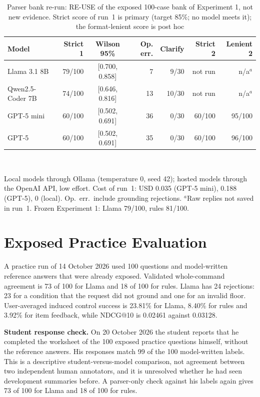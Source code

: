 \documentclass[conference]{IEEEtran}
\begin{document}
\begin{table}[t]\centering\scriptsize
\setlength{\tabcolsep}{2.6pt}
\caption{Parser bank re-run: RE-USE of the exposed 100-case bank of Experiment 1, not new evidence. Strict score of run~1 is primary (target 85\%; no model meets it); the format-lenient score is post hoc}\label{tab:parser}
\begin{tabular}{lrcrrrr}\toprule
Model & Strict 1 & Wilson 95\% & Op. err. & Clarify & Strict 2 & Lenient 2\\\midrule
Llama 3.1 8B & 79/100 & [0.700, 0.858] & 7 & 9/30 & not run & n/a$^{a}$\\
Qwen2.5-Coder 7B & 74/100 & [0.646, 0.816] & 13 & 10/30 & not run & n/a$^{a}$\\
GPT-5 mini & 60/100 & [0.502, 0.691] & 36 & 0/30 & 60/100 & 95/100\\
GPT-5 & 60/100 & [0.502, 0.691] & 35 & 0/30 & 60/100 & 96/100\\\bottomrule
\end{tabular}\\[2pt]
\parbox{\columnwidth}{\scriptsize Local models through Ollama (temperature 0, seed 42); hosted models through the OpenAI API, low effort. Cost of run~1: USD 0.035 (GPT-5 mini), 0.188 (GPT-5), 0 (local). Op.\ err.\ include grounding rejections. $^{a}$Raw replies not saved in run~1. Frozen Experiment 1: Llama 79/100, rules 81/100.}
\end{table}

\section{Exposed Practice Evaluation}
A practice run of 14 October 2026 used 100 questions and model-written reference answers that were already exposed. Validated whole-command agreement is 73 of 100 for Llama and 18 of 100 for rules. Llama has 24 rejections: 23 for a condition that the request did not ground and one for an invalid floor. User-averaged induced control success is 23.81\% for Llama, 8.40\% for rules and 3.92\% for item feedback, while NDCG@10 is 0.02461 against 0.03128. 

\textbf{Student response check.} On 20 October 2026 the student reports that he completed the worksheet of the 100 exposed practice questions himself, without the reference answers. His responses match 99 of the 100 model-written labels. This is a descriptive student-versus-model comparison, not agreement between two independent human annotators, and it is unresolved whether he had seen development summaries before. A parser-only check against his labels again gives 73 of 100 for Llama and 18 of 100 for rules.
\end{document}
